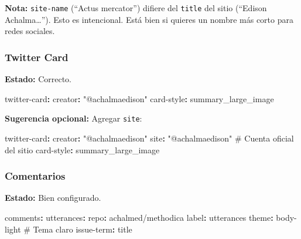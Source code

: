 \documentclass[
  doc,
  floatsintext,
  longtable,
  a4paper,
  nolmodern,
  notxfonts,
  notimes,
  12pt,
  colorlinks=true,linkcolor=blue,citecolor=blue,urlcolor=blue]{apa7}
\newenvironment{Shaded}{\begin{snugshade}}{\end{snugshade}}
\newcommand{\AttributeTok}[1]{\textcolor[rgb]{0.40,0.45,0.13}{#1}}
\newcommand{\CommentTok}[1]{\textcolor[rgb]{0.37,0.37,0.37}{#1}}
\newcommand{\FunctionTok}[1]{\textcolor[rgb]{0.28,0.35,0.67}{#1}}
\newcommand{\KeywordTok}[1]{\textcolor[rgb]{0.00,0.23,0.31}{\textbf{#1}}}
\newcommand{\StringTok}[1]{\textcolor[rgb]{0.13,0.47,0.30}{#1}}
\begin{document}
\textbf{Nota:} \texttt{site-name} (``Actus mercator'') difiere del
\texttt{title} del sitio (``Edison Achalma\ldots{}''). Esto es
intencional. Está bien si quieres un nombre más corto para redes
sociales.

\subsubsection{Twitter Card}\label{twitter-card}

\textbf{Estado:} Correcto.

\begin{Shaded}
\begin{Highlighting}[]
\FunctionTok{twitter{-}card}\KeywordTok{:}
\AttributeTok{  }\FunctionTok{creator}\KeywordTok{:}\AttributeTok{ }\StringTok{"@achalmaedison"}
\AttributeTok{  }\FunctionTok{card{-}style}\KeywordTok{:}\AttributeTok{ summary\_large\_image}
\end{Highlighting}
\end{Shaded}

\textbf{Sugerencia opcional:} Agregar \texttt{site}:

\begin{Shaded}
\begin{Highlighting}[]
\FunctionTok{twitter{-}card}\KeywordTok{:}
\AttributeTok{  }\FunctionTok{creator}\KeywordTok{:}\AttributeTok{ }\StringTok{"@achalmaedison"}
\AttributeTok{  }\FunctionTok{site}\KeywordTok{:}\AttributeTok{ }\StringTok{"@achalmaedison"}\CommentTok{              \# Cuenta oficial del sitio}
\AttributeTok{  }\FunctionTok{card{-}style}\KeywordTok{:}\AttributeTok{ summary\_large\_image}
\end{Highlighting}
\end{Shaded}

\subsubsection{Comentarios}\label{comentarios-1}

\textbf{Estado:} Bien configurado.

\begin{Shaded}
\begin{Highlighting}[]
\FunctionTok{comments}\KeywordTok{:}
\AttributeTok{  }\FunctionTok{utterances}\KeywordTok{:}
\AttributeTok{    }\FunctionTok{repo}\KeywordTok{:}\AttributeTok{ achalmed/methodica}
\AttributeTok{    }\FunctionTok{label}\KeywordTok{:}\AttributeTok{ utterances}
\AttributeTok{    }\FunctionTok{theme}\KeywordTok{:}\AttributeTok{ body{-}light}\CommentTok{                            \# Tema claro}
\AttributeTok{    }\FunctionTok{issue{-}term}\KeywordTok{:}\AttributeTok{ title}
\end{Highlighting}
\end{Shaded}
\end{document}
